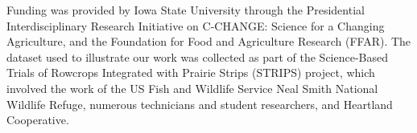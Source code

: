 
Funding was provided by Iowa State University through the Presidential
Interdisciplinary Research Initiative on C-CHANGE: Science for a
Changing Agriculture, and the Foundation for Food and Agriculture
Research (FFAR). The dataset used to illustrate our work was collected
as part of the Science-Based Trials of Rowcrops Integrated with
Prairie Strips (STRIPS) project, which involved the work of the US Fish
and Wildlife Service Neal Smith National Wildlife Refuge, numerous
technicians and student researchers, and Heartland Cooperative.


